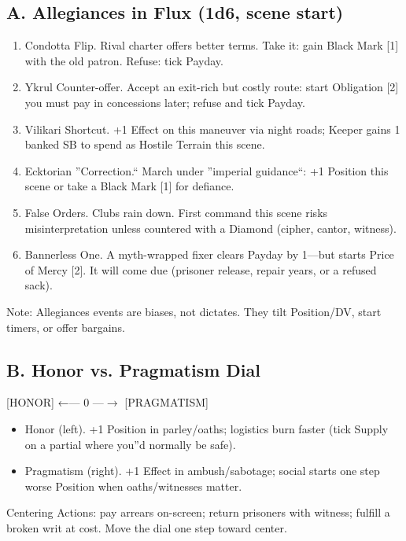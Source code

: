 \documentclass[11pt]{article}
\begin{document}
\subsection*{A. Allegiances in Flux (1d6, scene start)}
\begin{enumerate}
    \item Condotta Flip. Rival charter offers better terms. Take it: gain Black Mark [1] with the old patron. Refuse: tick Payday.
    \item Ykrul Counter-offer. Accept an exit-rich but costly route: start Obligation [2] you must pay in concessions later; refuse and tick Payday.
    \item Vilikari Shortcut. +1 Effect on this maneuver via night roads; Keeper gains 1 banked SB to spend as Hostile Terrain this scene.
    \item Ecktorian ''Correction.`` March under ''imperial guidance``: +1 Position this scene or take a Black Mark [1] for defiance.
    \item False Orders. Clubs rain down. First command this scene risks misinterpretation unless countered with a Diamond (cipher, cantor, witness).
    \item Bannerless One. A myth-wrapped fixer clears Payday by 1---but starts Price of Mercy [2]. It will come due (prisoner release, repair years, or a refused sack).
\end{enumerate}

Note: Allegiances events are biases, not dictates. They tilt Position/DV, start timers, or offer bargains.

\subsection*{B. Honor vs. Pragmatism Dial}

[HONOR] ←--- 0 ---$\rightarrow$ [PRAGMATISM]

\begin{itemize}
    \item Honor (left). +1 Position in parley/oaths; logistics burn faster (tick Supply on a partial where you''d normally be safe).
    \item Pragmatism (right). +1 Effect in ambush/sabotage; social starts one step worse Position when oaths/witnesses matter.
\end{itemize}

Centering Actions: pay arrears on-screen; return prisoners with witness; fulfill a broken writ at cost. Move the dial one step toward center.
\end{document}
